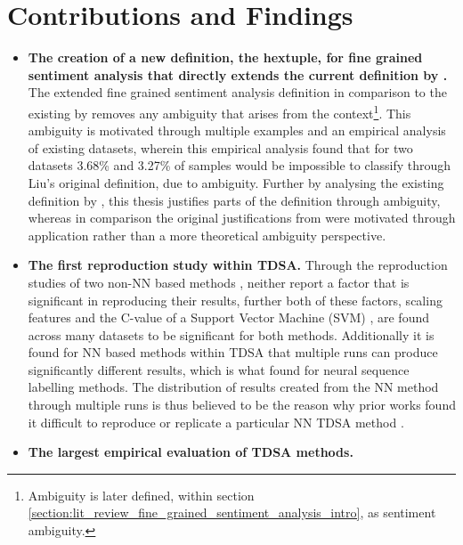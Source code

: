 \section{Contributions and Findings}
\begin{itemize}
    \item \textbf{The creation of a new definition, the hextuple, for fine grained sentiment analysis that directly extends the current definition by \citet{liu2015sentiment}.}\newline
    The extended fine grained sentiment analysis definition in comparison to the existing by \citet{liu2015sentiment} removes any ambiguity that arises from the context\footnote{Ambiguity is later defined, within section \ref{section:lit_review_fine_grained_sentiment_analysis_intro}, as sentiment ambiguity.}. This ambiguity is motivated through multiple examples and an empirical analysis of existing datasets, wherein this empirical analysis found that for two datasets 3.68\% and 3.27\% of samples would be impossible to classify through Liu's \citep{liu2015sentiment} original definition, due to ambiguity. Further by analysing the existing definition by \citet{liu2015sentiment}, this thesis justifies parts of the definition through ambiguity, whereas in comparison the original justifications from \citet{liu2015sentiment} were motivated through application rather than a more theoretical ambiguity perspective.  
    \item \textbf{The first reproduction study within TDSA.}\newline
    Through the reproduction studies of two non-NN based methods \citep{vo2015target, wang-etal-2017-tdparse}, neither report a factor that is significant in reproducing their results, further both of these factors, scaling features and the C-value of a Support Vector Machine (SVM) \citep{chang2011libsvm}, are found across many datasets to be significant for both methods. Additionally it is found for NN based methods within TDSA that multiple runs can produce significantly different results, which is what \citet{reimers-gurevych-2017-reporting} found for neural sequence labelling methods. The distribution of results created from the NN method through multiple runs is thus believed to be the reason why prior works found it difficult to reproduce or replicate a particular NN TDSA method \citep{tang-etal-2016-effective}.
    \item \textbf{The largest empirical evaluation of TDSA methods.}\newline

\end{itemize}
